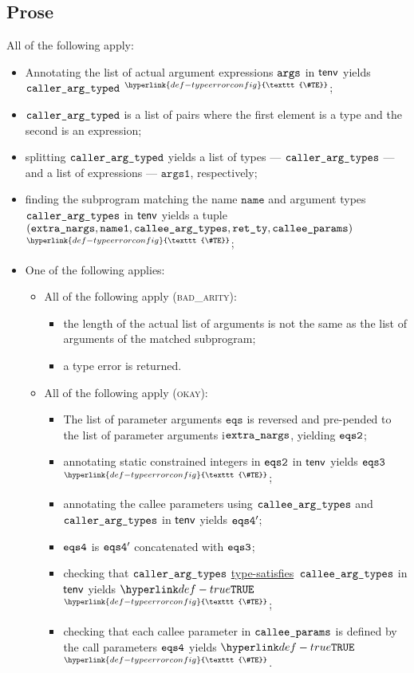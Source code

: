 \documentclass{book}
\newcommand\TypeErrorConfig[0]{\hyperlink{def-typeerrorconfig}{\texttt{\#TE}}}
\newcommand\ProseOrTypeError[0]{\hyperlink{def-proseortypeerror}{$^{\TypeErrorConfig}$}}
\newcommand\typesatisfies[0]{\hyperlink{def-typesatisfies}{type-satisfies}}
\newcommand\eqs[0]{\texttt{eqs}}
\newcommand\nameone[0]{\texttt{name1}}
\newcommand\vargsone[0]{\texttt{args1}}
\newcommand\name[0]{\texttt{name}}
\begin{document}
\subsection{Prose}
All of the following apply:
\begin{itemize}
  \item Annotating the list of actual argument expressions $\texttt{args}$ in $\textsf{tenv}$ yields $\texttt{caller\_arg\_typed}$ \ProseOrTypeError;
  \item $\texttt{caller\_arg\_typed}$ is a list of pairs where the first element is a type and the second is an expression;
  \item splitting $\texttt{caller\_arg\_typed}$ yields a list of types --- $\texttt{caller\_arg\_types}$ --- and a list of expressions ---
  $\vargsone$, respectively;
  \item finding the subprogram matching the name $\name$ and argument types $\texttt{caller\_arg\_types}$ in $\textsf{tenv}$
  yields a tuple $(\extranargs, \nameone, \calleeargtypes, \retty, \calleeparams)$ \ProseOrTypeError;
  \item One of the following applies:
  \begin{itemize}
    \item All of the following apply (\textsc{bad\_arity}):
    \begin{itemize}
      \item the length of the actual list of arguments is not the same as the list of arguments of the matched
      subprogram;
      \item a type error is returned.
    \end{itemize}

    \item All of the following apply (\textsc{okay}):
    \begin{itemize}
      \item The list of parameter arguments $\eqs$ is reversed and pre-pended to the list of parameter arguments
      i$\texttt{extra\_nargs}$, yielding $\texttt{eqs2}$;
      \item annotating static constrained integers in $\texttt{eqs2}$ in $\textsf{tenv}$ yields $\texttt{eqs3}$ \ProseOrTypeError;
      \item annotating the callee parameters using $\texttt{callee\_arg\_types}$ and $\texttt{caller\_arg\_types}$ in $\textsf{tenv}$
      yields $\texttt{eqs4}'$;
      \item $\texttt{eqs4}$ is $\texttt{eqs4}'$ concatenated with $\texttt{eqs3}$;
      \item checking that $\texttt{caller\_arg\_types}$ \typesatisfies\ $\texttt{callee\_arg\_types}$ in $\textsf{tenv}$ yields
      $\True$ \ProseOrTypeError;
      \item checking that each callee parameter in $\texttt{callee\_params}$ is defined by the call
      parameters $\texttt{eqs4}$ yields $\True$ \ProseOrTypeError.
    \end{itemize}
  \end{itemize}
\end{itemize}
\end{document}
